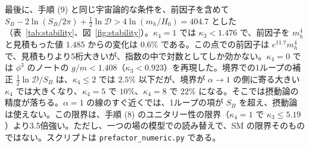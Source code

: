 \documentclass[a4paper,10pt]{ltjsarticle}
\begin{document}
最後に、手順 (9) と同じ宇宙論的な条件を、前因子を含めて $S_B-2\ln(S_B/2\pi)+\frac12\ln\mathcal D>4\ln(m_h/H_0)=404.7$ とした（表~\ref{tab:stability}、図~\ref{fig:stability}）。$\kappa_4=1$ では $\kappa_3<1.476$ で、前因子を $m_h^4$ と見積もった値 $1.485$ からの変化は $0.6\%$ である。この点での前因子は $e^{11.7}m_h^4$ で、見積もりより5桁大きいが、指数の中で対数としてしか効かない。$\kappa_4=0$ では $\phi^3$ のノートの $g/m<1.408$（$\kappa_3<0.923$）を再現した。境界での1ループの補正 $\frac12\ln\mathcal D/S_B$ は、$\kappa_4\le2$ では $2.5\%$ 以下だが、境界が $\alpha\to1$ の側に寄る大きい $\kappa_4$ では大きくなり、$\kappa_4=5$ で $10\%$、$\kappa_4=8$ で $22\%$ になる。そこでは摂動論の精度が落ちる。$\alpha=1$ の線のすぐ近くでは、1ループの項が $S_B$ を超え、摂動論は使えない。この限界は、手順 (8) のユニタリー性の限界（$\kappa_4=1$ で $\kappa_3\le5.19$）より3.5倍強い。ただし、一つの場の模型での読み替えで、SM の限界そのものではない。スクリプトは \texttt{prefactor\_numeric.py} である。
\end{document}
